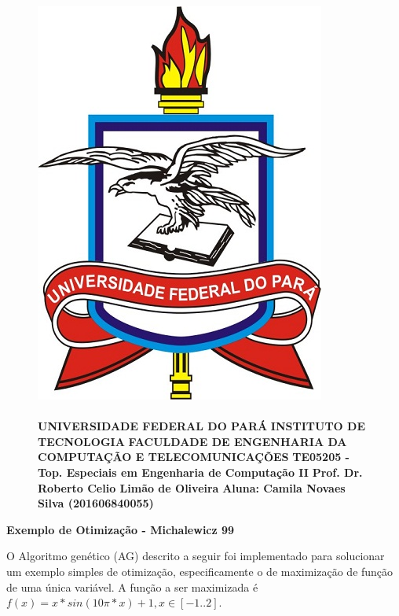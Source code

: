 \documentclass[12pt]{article}
\title{}
\date{}
\begin{document}
\begin{figure}
		\begin{minipage}{.3\linewidth}
			\centering
			\includegraphics[width=.6\linewidth]{imgs/ufpa.jpg}
		\end{minipage}
		\begin{minipage}{.70\linewidth}
			\flushleft
			\paragraph{}
			\textbf{ }\newline
			\textbf{UNIVERSIDADE FEDERAL DO PARÁ} \newline
			\textbf{INSTITUTO DE TECNOLOGIA} \newline
			\textbf{FACULDADE DE ENGENHARIA DA COMPUTAÇÃO E TELECOMUNICAÇÕES} \newline
			\textbf{TE05205 - Top. Especiais em Engenharia de Computação II} \newline
            \textbf{Prof. Dr. Roberto Celio Limão de Oliveira} \newline
            \textbf{Aluna: Camila Novaes Silva (201606840055)}
		\end{minipage}
\end{figure}
\FloatBarrier
\begin{center}
    {\Large \textbf{Exemplo de Otimização - Michalewicz 99}}
\end{center}
\hfill

O Algoritmo genético (AG) descrito a seguir foi implementado para solucionar um exemplo simples
de otimização, especificamente o de maximização de função de uma única variável. A função a ser
maximizada é $f(x) = x * sin(10\pi*x) + 1, x \in [-1..2]$.
\end{document}
